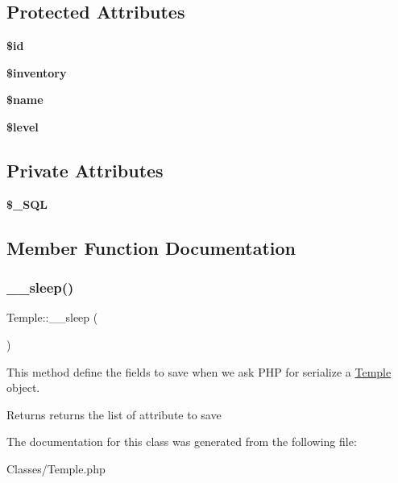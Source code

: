 \subsection*{Protected Attributes}
\begin{DoxyCompactItemize}
\item 
\mbox{\label{classTemple_a47f629bab7bfc62cfad416e1483d9909}} 
{\bfseries \$id}
\item 
\mbox{\label{classTemple_a24b4a0670b93e74d9dd94a40f8d5d356}} 
{\bfseries \$inventory}
\item 
\mbox{\label{classTemple_af8843aab4c64cf78abb4183d723297cd}} 
{\bfseries \$name}
\item 
\mbox{\label{classTemple_a7a8c0084e0207f83b694d52b5ebea08c}} 
{\bfseries \$level}
\end{DoxyCompactItemize}
\subsection*{Private Attributes}
\begin{DoxyCompactItemize}
\item 
\mbox{\label{classTemple_a04fdd3e820c9a6ea4b01b96474e8e8d7}} 
{\bfseries \$\+\_\+\+S\+QL}
\end{DoxyCompactItemize}


\subsection{Member Function Documentation}
\mbox{\label{classTemple_a08700fe7671bb090ddb042a65a452609}} 
\subsubsection{\texorpdfstring{\+\_\+\+\_\+sleep()}{\_\_sleep()}}
{\footnotesize\ttfamily Temple\+::\+\_\+\+\_\+sleep (\begin{DoxyParamCaption}{ }\end{DoxyParamCaption})}



This method define the fields to save when we ask P\+HP for serialize a \mbox{\hyperlink{classTemple}{Temple}} object. 

\begin{DoxyReturn}{Returns}
returns the list of attribute to save 
\end{DoxyReturn}


The documentation for this class was generated from the following file\+:\begin{DoxyCompactItemize}
\item 
Classes/Temple.\+php\end{DoxyCompactItemize}

